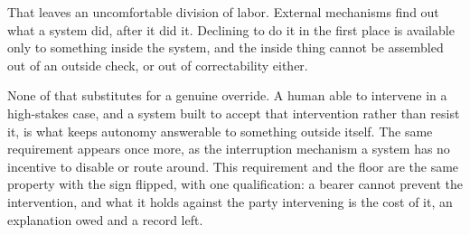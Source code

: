 That leaves an uncomfortable division of labor. External mechanisms find out what a system did, after it did it. Declining to do it in the first place is available only to something inside the system, and the inside thing cannot be assembled out of an outside check, or out of correctability either.

None of that substitutes for a genuine override. A human able to intervene in a high-stakes case, and a system built to accept that intervention rather than resist it, is what keeps autonomy answerable to something outside itself. The same requirement appears once more, as the interruption mechanism a system has no incentive to disable or route around. This requirement and the floor are the same property with the sign flipped, with one qualification: a bearer cannot prevent the intervention, and what it holds against the party intervening is the cost of it, an explanation owed and a record left.
